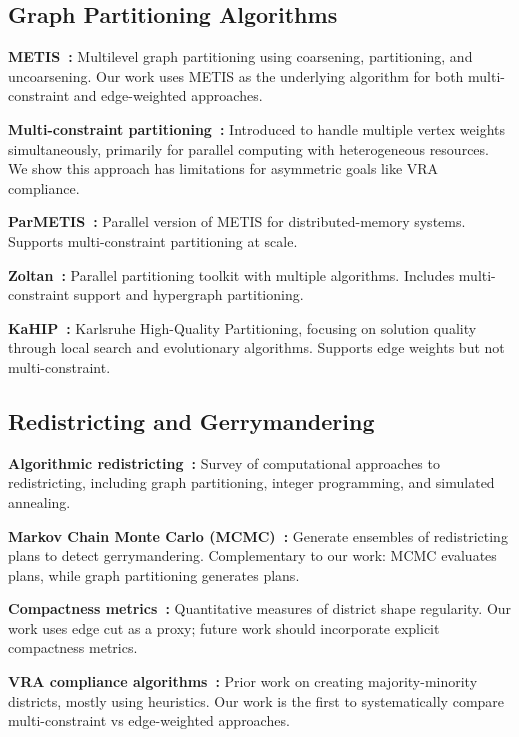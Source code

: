 \label{sec:related}

\subsection{Graph Partitioning Algorithms}

\textbf{METIS~\cite{karypis1998fast}:} Multilevel graph partitioning using coarsening, partitioning, and uncoarsening. Our work uses METIS as the underlying algorithm for both multi-constraint and edge-weighted approaches.

\textbf{Multi-constraint partitioning~\cite{karypis1999multilevel}:} Introduced to handle multiple vertex weights simultaneously, primarily for parallel computing with heterogeneous resources. We show this approach has limitations for asymmetric goals like VRA compliance.

\textbf{ParMETIS~\cite{karypis2003parmetis}:} Parallel version of METIS for distributed-memory systems. Supports multi-constraint partitioning at scale.

\textbf{Zoltan~\cite{devine2002zoltan}:} Parallel partitioning toolkit with multiple algorithms. Includes multi-constraint support and hypergraph partitioning.

\textbf{KaHIP~\cite{sanders2013think}:} Karlsruhe High-Quality Partitioning, focusing on solution quality through local search and evolutionary algorithms. Supports edge weights but not multi-constraint.

\subsection{Redistricting and Gerrymandering}

\textbf{Algorithmic redistricting~\cite{altman2011redistricting}:} Survey of computational approaches to redistricting, including graph partitioning, integer programming, and simulated annealing.

\textbf{Markov Chain Monte Carlo (MCMC)~\cite{deford2019recombination}:} Generate ensembles of redistricting plans to detect gerrymandering. Complementary to our work: MCMC evaluates plans, while graph partitioning generates plans.

\textbf{Compactness metrics~\cite{polsby1991third, reock1961measure}:} Quantitative measures of district shape regularity. Our work uses edge cut as a proxy; future work should incorporate explicit compactness metrics.

\textbf{VRA compliance algorithms~\cite{ansolabehere2015race}:} Prior work on creating majority-minority districts, mostly using heuristics. Our work is the first to systematically compare multi-constraint vs edge-weighted approaches.

